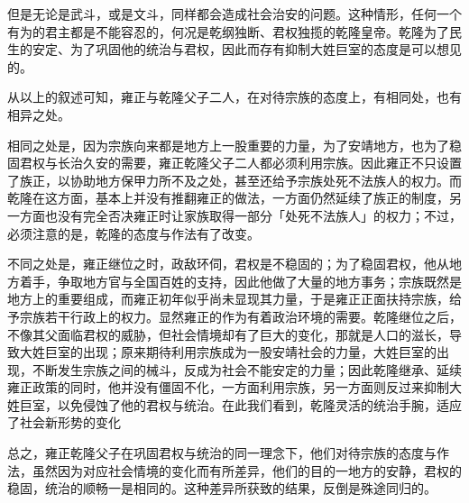 但是无论是武斗，或是文斗，同样都会造成社会治安的问题。这种情形，任何一个有为的君主都是不能容忍的，何况是乾纲独断、君权独揽的乾隆皇帝。乾隆为了民生的安定、为了巩固他的统治与君权，因此而存有抑制大姓巨室的态度是可以想见的。


\noindent 从以上的叙述可知，雍正与乾隆父子二人，在对待宗族的态度上，有相同处，也有相异之处。

\vfill
\begin{BookNotes}
\end{BookNotes}

相同之处是，因为宗族向来都是地方上一股重要的力量，为了安靖地方，也为了稳固君权与长治久安的需要，雍正乾隆父子二人都必须利用宗族。因此雍正不只设置了族正，以协助地方保甲力所不及之处，甚至还给予宗族处死不法族人的权力。而乾隆在这方面，基本上并没有推翻雍正的做法，一方面仍然延续了族正的制度，另一方面也没有完全否决雍正时让家族取得一部分「处死不法族人」的权力；不过，必须注意的是，乾隆的态度与作法有了改变。

不同之处是，雍正继位之时，政敌环伺，君权是不稳固的；为了稳固君权，他从地方着手，争取地方官与全国百姓的支持，因此他做了大量的地方事务；宗族既然是地方上的重要组成，而雍正初年似乎尚未显现其力量，于是雍正正面扶持宗族，给予宗族若干行政上的权力。显然雍正的作为有着政治环境的需要。乾隆继位之后，不像其父面临君权的威胁，但社会情境却有了巨大的变化，那就是人口的滋长，导致大姓巨室的出现；原来期待利用宗族成为一股安靖社会的力量，大姓巨室的出现，不断发生宗族之间的械斗，反成为社会不能安定的力量；因此乾隆继承、延续雍正政策的同时，他并没有僵固不化，一方面利用宗族，另一方面则反过来抑制大姓巨室，以免侵蚀了他的君权与统治。在此我们看到，乾隆灵活的统治手腕，适应了社会新形势的变化

总之，雍正乾隆父子在巩固君权与统治的同一理念下，他们对待宗族的态度与作法，虽然因为对应社会情境的变化而有所差异，他们的目的一地方的安静，君权的稳固，统治的顺畅一是相同的。这种差异所获致的结果，反倒是殊途同归的。


